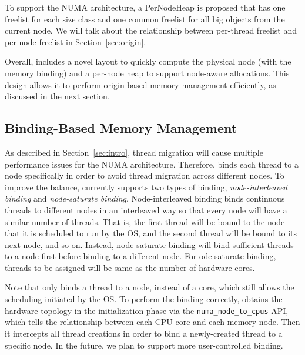 
To support the NUMA architecture, a PerNodeHeap is proposed that has one freelist for each size class and one common freelist for all big objects  from the current node. We will talk about the relationship between per-thread freelist and per-node freelist in Section~\ref{sec:origin}. 

Overall, \NM{} includes a novel layout to quickly compute the physical node (with the memory binding) and a per-node heap to support node-aware allocations. This design allows it to perform origin-based memory management efficiently, as discussed in the next section. 

\subsection{Binding-Based Memory Management} 
\label{sec:balance}
As described in Section~\ref{sec:intro}, thread migration will cause multiple performance issues for the NUMA architecture. Therefore, \NM{} binds each thread to a node specifically in order to avoid thread migration across different nodes. To improve the balance, \NM{} currently supports two types of binding, \textit{node-interleaved binding} and \textit{node-saturate binding}. Node-interleaved binding binds continuous threads to different nodes in an interleaved way so that every node will have a similar number of threads. That is, the first thread will be bound to the node that it is scheduled to run by the OS, and the second thread will be bound to its next node, and so on. Instead, node-saturate binding will bind sufficient threads to a node first before binding to a different node. For ode-saturate binding, threads to be assigned will be same as the number of hardware cores.  

Note that \NM{} only binds a thread to a node, instead of a core, which still allows the scheduling initiated by the OS. To perform the binding correctly, \NM{} obtains the hardware topology in the initialization phase via the \texttt{numa\_node\_to\_cpus} API, which tells the relationship between each CPU core and each memory node. Then it intercepts all thread creations in order to bind a newly-created thread to a specific node. In the future, we plan to support more user-controlled binding. 

